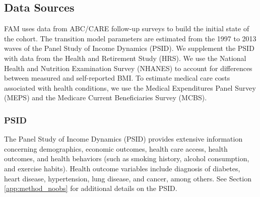 \subsection{Data Sources} \label{section:data}
\noindent FAM uses data from ABC/CARE follow-up surveys to build the initial state of the cohort. 
The transition model parameters are estimated from the 1997 to 2013 waves of the Panel Study of Income Dynamics (PSID). 
We supplement the PSID with data from the Health and Retirement Study (HRS). We use the National Health and Nutrition Examination Survey (NHANES) 
to account for differences between measured and self-reported BMI.
To estimate medical care costs associated with health conditions, we use the Medical Expenditures Panel Survey (MEPS) and the Medicare Current Beneficiaries Survey (MCBS). \\


\subsubsection{PSID}
\label{section:data_psid}

\noindent The Panel Study  of Income Dynamics (PSID) provides extensive information concerning demographics, economic outcomes, health care access, health outcomes, and health behaviors (such as smoking history, alcohol consumption, and exercise habits). Health outcome variables include diagnosis of diabetes, heart disease, hypertension, lung disease, and cancer, among others. See Section \ref{app:method_noobs} for additional details on the PSID. \\

